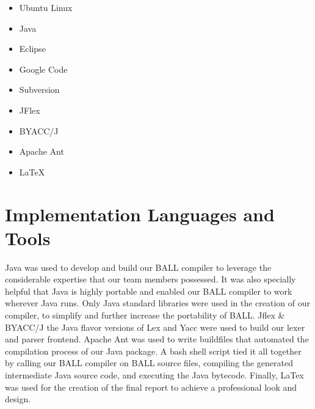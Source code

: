 \begin{itemize}

\item Ubuntu Linux \item Java
\item Eclipse \item Google Code
\item Subversion \item JFlex
\item BYACC/J \item Apache Ant
\item LaTeX

\end{itemize}

\section{Implementation Languages and Tools}

Java was used to develop and build our BALL compiler to leverage the
considerable expertise that our team members possessed. It was also
specially helpful that Java is highly portable and enabled our BALL
compiler to work wherever Java runs. Only Java standard libraries were
used in the creation of our compiler, to simplify and further increase
the portability of BALL. Jflex \& BYACC/J the Java flavor versions of
Lex and Yacc were used to build our lexer and parser frontend. 
Apache Ant was used to write buildfiles that automated the compilation process 
of our Java package. A bash shell script tied it all together by calling our 
BALL compiler on BALL source files, compiling the generated intermediate Java
source code, and executing the Java bytecode. Finally, LaTex was used for the 
creation of the final report to achieve a professional look and design.
